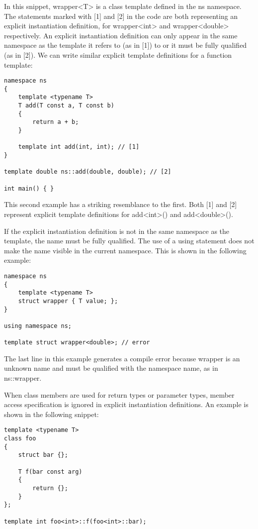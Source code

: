 In this snippet, wrapper<T> is a class template defined in the ns namespace. The statements marked with [1] and [2] in the code are both representing an explicit instantiation definition, for wrapper<int> and wrapper<double> respectively. An explicit instantiation definition can only appear in the same namespace as the template it refers to (as in [1]) to or it must be fully qualified (as in [2]). We can write similar explicit template definitions for a function template:

\begin{lstlisting}[style=styleCXX]
namespace ns
{
	template <typename T>
	T add(T const a, T const b)
	{
		return a + b;
	}

	template int add(int, int); // [1]
}

template double ns::add(double, double); // [2]

int main() { }
\end{lstlisting}

This second example has a striking resemblance to the first. Both [1] and [2] represent explicit template definitions for add<int>() and add<double>().

If the explicit instantiation definition is not in the same namespace as the template, the name must be fully qualified. The use of a using statement does not make the name visible in the current namespace. This is shown in the following example:

\begin{lstlisting}[style=styleCXX]
namespace ns
{
	template <typename T>
	struct wrapper { T value; };
}

using namespace ns;

template struct wrapper<double>; // error
\end{lstlisting}

The last line in this example generates a compile error because wrapper is an unknown name and must be qualified with the namespace name, as in ns::wrapper.

When class members are used for return types or parameter types, member access specification is ignored in explicit instantiation definitions. An example is shown in the following snippet:

\begin{lstlisting}[style=styleCXX]
template <typename T>
class foo
{
	struct bar {};
	
	T f(bar const arg)
	{
		return {};
	}
};

template int foo<int>::f(foo<int>::bar);
\end{lstlisting}

